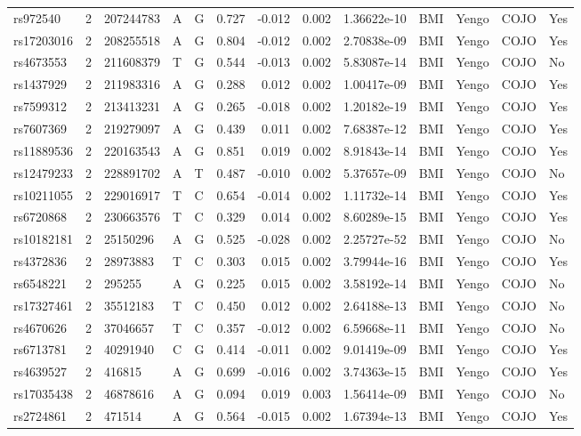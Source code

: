 \documentclass[11pt,twoside]{bristolthesis}
\begin{document}
\begin{longtable}[t]{lrlllrrrlllll}
rs972540 & 2 & 207244783 & A & G & 0.727 & -0.012 & 0.002 & 1.36622e-10 & BMI & Yengo & COJO & Yes\\
rs17203016 & 2 & 208255518 & A & G & 0.804 & -0.012 & 0.002 & 2.70838e-09 & BMI & Yengo & COJO & Yes\\
rs4673553 & 2 & 211608379 & T & G & 0.544 & -0.013 & 0.002 & 5.83087e-14 & BMI & Yengo & COJO & No\\
\addlinespace
rs1437929 & 2 & 211983316 & A & G & 0.288 & 0.012 & 0.002 & 1.00417e-09 & BMI & Yengo & COJO & Yes\\
rs7599312 & 2 & 213413231 & A & G & 0.265 & -0.018 & 0.002 & 1.20182e-19 & BMI & Yengo & COJO & Yes\\
rs7607369 & 2 & 219279097 & A & G & 0.439 & 0.011 & 0.002 & 7.68387e-12 & BMI & Yengo & COJO & Yes\\
rs11889536 & 2 & 220163543 & A & G & 0.851 & 0.019 & 0.002 & 8.91843e-14 & BMI & Yengo & COJO & Yes\\
rs12479233 & 2 & 228891702 & A & T & 0.487 & -0.010 & 0.002 & 5.37657e-09 & BMI & Yengo & COJO & No\\
\addlinespace
rs10211055 & 2 & 229016917 & T & C & 0.654 & -0.014 & 0.002 & 1.11732e-14 & BMI & Yengo & COJO & Yes\\
rs6720868 & 2 & 230663576 & T & C & 0.329 & 0.014 & 0.002 & 8.60289e-15 & BMI & Yengo & COJO & Yes\\
rs10182181 & 2 & 25150296 & A & G & 0.525 & -0.028 & 0.002 & 2.25727e-52 & BMI & Yengo & COJO & No\\
rs4372836 & 2 & 28973883 & T & C & 0.303 & 0.015 & 0.002 & 3.79944e-16 & BMI & Yengo & COJO & Yes\\
rs6548221 & 2 & 295255 & A & G & 0.225 & 0.015 & 0.002 & 3.58192e-14 & BMI & Yengo & COJO & No\\
\addlinespace
rs17327461 & 2 & 35512183 & T & C & 0.450 & 0.012 & 0.002 & 2.64188e-13 & BMI & Yengo & COJO & No\\
rs4670626 & 2 & 37046657 & T & C & 0.357 & -0.012 & 0.002 & 6.59668e-11 & BMI & Yengo & COJO & No\\
rs6713781 & 2 & 40291940 & C & G & 0.414 & -0.011 & 0.002 & 9.01419e-09 & BMI & Yengo & COJO & Yes\\
rs4639527 & 2 & 416815 & A & G & 0.699 & -0.016 & 0.002 & 3.74363e-15 & BMI & Yengo & COJO & Yes\\
rs17035438 & 2 & 46878616 & A & G & 0.094 & 0.019 & 0.003 & 1.56414e-09 & BMI & Yengo & COJO & No\\
\addlinespace
rs2724861 & 2 & 471514 & A & G & 0.564 & -0.015 & 0.002 & 1.67394e-13 & BMI & Yengo & COJO & Yes\\

\end{longtable}
\end{document}
